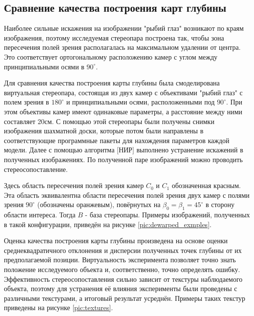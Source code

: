 
\subsection{Сравнение качества построения карт глубины}

Наиболее сильные искажения на изображении "рыбий глаз" возникают по краям изображения, поэтому исследуемая стереопара построена так,
чтобы зона пересечения полей зрения располагалась на максимальном удалении от центра. Это соответствует ортогональному расположению
камер с углом между принципиальными осями в $90^\circ$. 

Для сравнения качества построения карты глубины была смоделирована виртуальная стереопара, состоящая из двух камер с объективами 
"рыбий глаз" с полем зрения в $180^\circ$ и принципиальными осями, расположенными под $90^\circ$. При этом объективы камер имеют 
одинаковые параметры, а расстояние между ними составляет 20см. С помощью этой стереопары были получены снимки изображения шахматной доски, 
которые потом были направлены в соответствующие программные пакеты для нахождения параметров каждой модели. Далее с помощью алгоритма [НИР]				%
выполнено устранение искажений в полученных изображениях. По полученной паре изображений можно проводить стереосопоставление. 


Здесь область пересечения полей зрения камер $C_0$ и $C_1$ обозначенная красным.
Эта область эквивалентна области пересечения полей зрения двух камер с полями зрения $90^\circ$ (обозначены
оранжевым), повёрнутых на $\beta_0 = \beta_1  = 45^\circ$ в сторону области интереса. Тогда $B$ - база стереопары.
Примеры изображений, полученных в такой конфигурации, приведён на рисунке \ref{pic:dewarped_exmples}. 



Оценка качества построения карты глубины произведена на основе оценки среднеквадратичного отклонения и дисперсии полученных точек 
глубины от их предполагаемой позиции. Виртуальность эксперимента позволяет точно знать положение исследуемого объекта и, соответственно, 
точно определять ошибку. Эффективность стереосопоставления \cite{SGBM} сильно зависит от текстуры наблюдаемого объекта, поэтому для устранения 
её влияния эксперименты были проведены с различными текстурами, а итоговый результат усреднён. Примеры таких текстур приведены на рисунке \ref{pic:textures}. 


